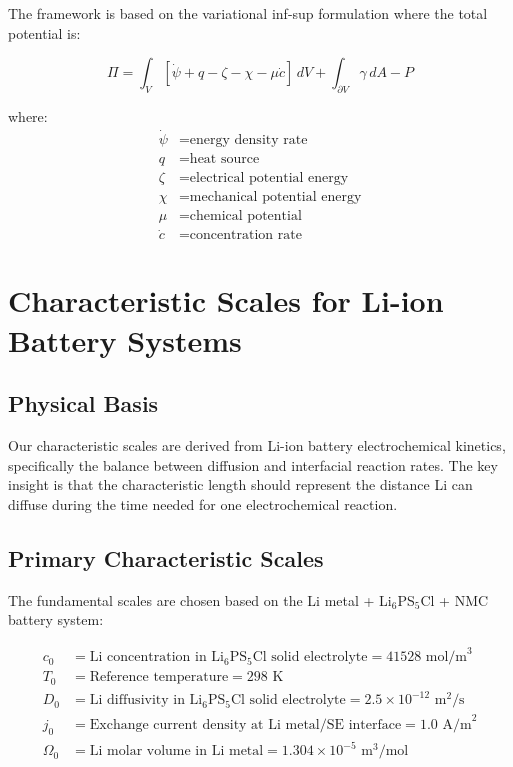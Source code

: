 \documentclass[11pt,a4paper]{article}
\begin{document}
The framework is based on the variational inf-sup formulation where the total potential is:

\begin{equation}
\Pi = \int_V [\dot{\psi} + q - \zeta - \chi - \mu\dot{c}] \, dV + \int_{\partial V} \gamma \, dA - P
\label{eq:total_potential}
\end{equation}

where:
\begin{align}
\dot{\psi} &= \text{energy density rate} \\
q &= \text{heat source} \\
\zeta &= \text{electrical potential energy} \\
\chi &= \text{mechanical potential energy} \\
\mu &= \text{chemical potential} \\
\dot{c} &= \text{concentration rate}
\end{align}

\section{Characteristic Scales for Li-ion Battery Systems}

\subsection{Physical Basis}

Our characteristic scales are derived from Li-ion battery electrochemical kinetics, specifically the balance between diffusion and interfacial reaction rates. The key insight is that the characteristic length should represent the distance Li can diffuse during the time needed for one electrochemical reaction.

\subsection{Primary Characteristic Scales}

The fundamental scales are chosen based on the Li metal + Li$_6$PS$_5$Cl + NMC battery system:

\begin{align}
c_0 &= \text{Li concentration in Li$_6$PS$_5$Cl solid electrolyte} = 41528 \text{ mol/m}^3 \\
T_0 &= \text{Reference temperature} = 298 \text{ K} \\
D_0 &= \text{Li diffusivity in Li$_6$PS$_5$Cl solid electrolyte} = 2.5 \times 10^{-12} \text{ m}^2\text{/s} \\
j_0 &= \text{Exchange current density at Li metal/SE interface} = 1.0 \text{ A/m}^2 \\
\Omega_0 &= \text{Li molar volume in Li metal} = 1.304 \times 10^{-5} \text{ m}^3\text{/mol}
\end{align}
\end{document}
